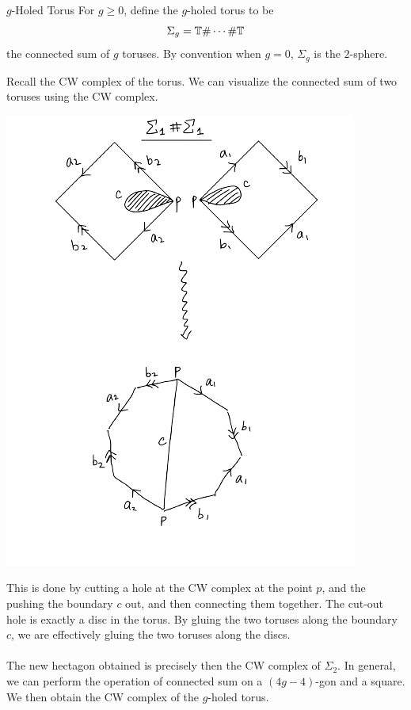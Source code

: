 \documentclass[a4paper]{article}
\begin{document}
\begin{defn}{$g$-Holed Torus}{} For $g\geq 0$, define the $g$-holed torus to be $$\Sigma_g=\mathbb{T}\#\cdots\#\mathbb{T}$$ the connected sum of $g$ toruses. By convention when $g=0$, $\Sigma_g$ is the $2$-sphere. 
\end{defn}

Recall the CW complex of the torus. We can visualize the connected sum of two toruses using the CW complex. 

\begin{center}
\includegraphics[scale = 0.8]{Image 1}
\end{center}

This is done by cutting a hole at the CW complex at the point $p$, and the pushing the boundary $c$ out, and then connecting them together. The cut-out hole is exactly a disc in the torus. By gluing the two toruses along the boundary $c$, we are effectively gluing the two toruses along the discs. \\~\\

The new hectagon obtained is precisely then the CW complex of $\Sigma_2$. In general, we can perform the operation of connected sum on a $(4g-4)$-gon and a square. We then obtain the CW complex of the $g$-holed torus. 
\end{document}
